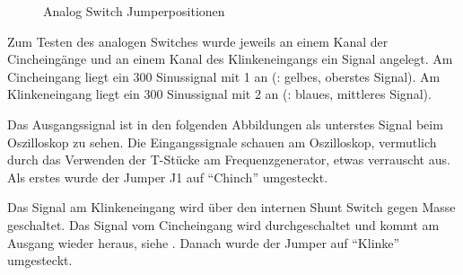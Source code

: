 \begin{figure}[htb]
    \centering
    \qquad
    \qquad
    \caption{Analog Switch Jumperpositionen}
    \label{fig:audio-switch-jmp}
\end{figure}


\FloatBarrier
Zum Testen des analogen Switches wurde jeweils an einem Kanal der Cincheingänge und an einem Kanal des Klinkeneingangs ein Signal angelegt. Am Cincheingang liegt ein \unit{300}{\milli\volt} Sinussignal mit \unit{1}{\kilo\hertz} an (: gelbes, oberstes Signal). Am Klinkeneingang liegt ein \unit{300}{\milli\volt} Sinussignal mit \unit{2}{\kilo\hertz} an (: blaues, mittleres Signal).


Das Ausgangssignal ist in den folgenden Abbildungen als unterstes Signal beim Oszilloskop zu sehen. Die Eingangssignale schauen am Oszilloskop, vermutlich durch das Verwenden der T-Stücke am Frequenzgenerator, etwas verrauscht aus. Als erstes wurde der Jumper J1 auf \enquote{Chinch} umgesteckt.


Das Signal am Klinkeneingang wird über den internen Shunt Switch gegen Masse geschaltet. Das Signal vom Cincheingang wird durchgeschaltet und kommt am Ausgang wieder heraus, siehe . Danach wurde der Jumper auf \enquote{Klinke} umgesteckt.

